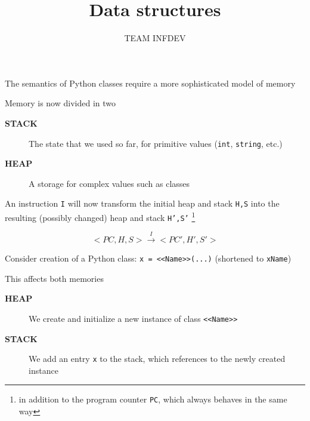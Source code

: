 \documentclass{beamer}
\title{Data structures}
\author{TEAM INFDEV}
\institute{Hogeschool Rotterdam \\ 
Rotterdam, Netherlands}
\date{}
\begin{document}
\maketitle

\begin{slide}{
\item The semantics of Python classes require a more sophisticated model of memory
\item Memory is now divided in two
\begin{description}
\item[\textbf{STACK}] The state that we used so far, for primitive values (\texttt{int}, \texttt{string}, etc.)
\item[\textbf{HEAP}] A storage for complex values such as classes
\end{description}
}\end{slide}

\begin{slide}{
\item An instruction \texttt{I} will now transform the initial heap and stack \texttt{H,S} into the resulting (possibly changed) heap and stack \texttt{H',S'} \footnote{in addition to the program counter \texttt{PC}, which always behaves in the same way}

$$<PC,H,S> \overset{I}{\rightarrow} <PC',H',S'>$$
}\end{slide}

\begin{slide}{
\item Consider creation of a Python class: \texttt{x = <<Name>>(...)} (shortened to \texttt{xName})
\item This affects both memories
\begin{description}
\item[\textbf{HEAP}] We create and initialize a new instance of class \texttt{<<Name>>}
\item[\textbf{STACK}] We add an entry \texttt{x} to the stack, which references to the newly created instance
\end{description}
}\end{slide}
\end{document}
